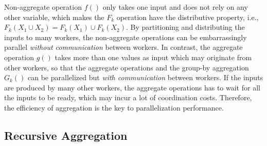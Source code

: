 
Non-aggregate operation $f()$ only takes one input and does not rely on any other variable, which makes the $F_k$ operation have the distributive property, i.e., $F_k(X_1 \cup X_2)=F_k(X_1) \cup F_k(X_2)$. By partitioning and distributing the inputs to many workers, the non-aggregate operations can be embarrassingly parallel \emph{without communication} between workers. In contrast, the aggregate operation $g()$ takes more than one values as input which may originate from other workers, so that the aggregate operations and the group-by aggregation $G_k()$ can be parallelized but \emph{with communication} between workers. If the inputs are produced by many other workers, the aggregate operations has to wait for all the inputs to be ready, which may incur a lot of coordination costs. Therefore, the efficiency of aggregation is the key to parallelization performance.




\subsection{Recursive Aggregation}

